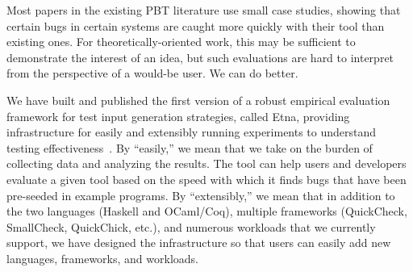 

%
%

%
Most papers in the existing PBT literature use small case studies,
showing that certain bugs in certain systems
are caught more quickly with their tool than existing ones. For
theoretically-oriented work, this may be sufficient
to demonstrate the interest of an idea, but such evaluations
are hard to interpret from the perspective of a would-be user.
We can do better.

We have built and published the first version of a robust empirical evaluation
framework for
test input generation strategies, called Etna, providing infrastructure
for easily and extensibly running experiments to understand testing
effectiveness~\cite{shi2023etna}.  By ``easily,'' we mean that we take on the burden of
collecting data and analyzing the results.  The tool
can help users and developers evaluate a given tool based on
the
speed with which it finds bugs that have been pre-seeded in example programs. By
``extensibly,'' we mean that in addition to the two languages (Haskell and
OCaml/Coq), multiple frameworks (QuickCheck, SmallCheck, QuickChick, etc.), and
numerous workloads that we currently support, we have designed the
infrastructure so that users can easily add new
languages, frameworks, and workloads.

